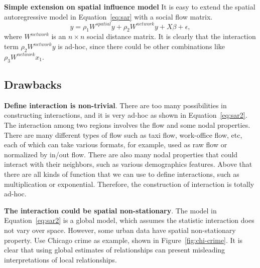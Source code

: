 \textbf{Simple extension on spatial influence model}
It is easy to extend the spatial autoregressive model in Equation~\ref{eq:sar} with a social flow matrix.
\begin{equation}
\label{eq:sar2}
y = \rho_1 W^{spatial} y + \rho_2 W^{network} y + X \beta + \epsilon,
\end{equation}
where $W^{network}$ is an $n\times n$ social distance matrix.
It is clearly that the interaction term $\rho_2 W^{network} y$ is ad-hoc, since there could be other combinations like $\rho_3 W^{network} x_1$.





\subsection{Drawbacks}

\textbf{Define interaction is non-trivial}. There are too many possibilities in constructing interactions, and it is very ad-hoc as shown in Equation~\ref{eq:sar2}. The interaction among two regions involves the flow and some nodal properties. There are many different types of flow such as taxi flow, work-office flow, etc, each of which can take various formats, for example, used as raw flow or normalized by in/out flow. There are also many nodal properties that could interact with their neighbors, such as various demographics features. Above that there are all kinds of function that we can use to define interactions, such as multiplication or exponential. Therefore, the construction of interaction is totally ad-hoc. 


\textbf{The interaction could be spatial non-stationary}. The model in Equation~\ref{eq:sar2} is a global model, which assumes the statistic interaction does not vary over space. However, some urban data have spatial non-stationary property. Use Chicago crime as example, shown in Figure~\ref{fig:chi-crime}. It is clear that using global estimates of relationships can present misleading interpretations of local relationships.


